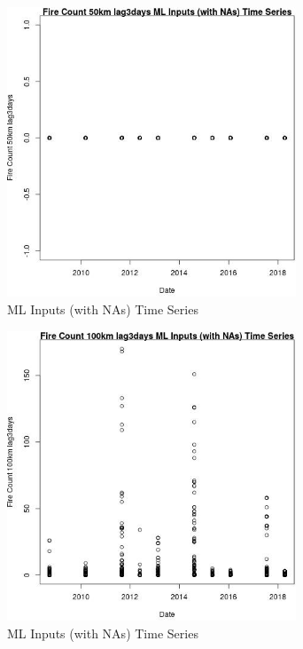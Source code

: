 \begin{figure} 
\centering  
\includegraphics[width=0.77\textwidth]{Code_Outputs/Report_ML_input_PM25_Step4_part_e_de_duplicated_aves_compiled_2019-05-18wNAs_Fire_Count_50km_lag3daysvDate.jpg} 
\caption{\label{fig:Report_ML_input_PM25_Step4_part_e_de_duplicated_aves_compiled_2019-05-18wNAsFire_Count_50km_lag3daysvDate}ML Inputs (with NAs) Time Series} 
\end{figure} 
 

\begin{figure} 
\centering  
\includegraphics[width=0.77\textwidth]{Code_Outputs/Report_ML_input_PM25_Step4_part_e_de_duplicated_aves_compiled_2019-05-18wNAs_Fire_Count_100km_lag3daysvDate.jpg} 
\caption{\label{fig:Report_ML_input_PM25_Step4_part_e_de_duplicated_aves_compiled_2019-05-18wNAsFire_Count_100km_lag3daysvDate}ML Inputs (with NAs) Time Series} 
\end{figure} 
 

